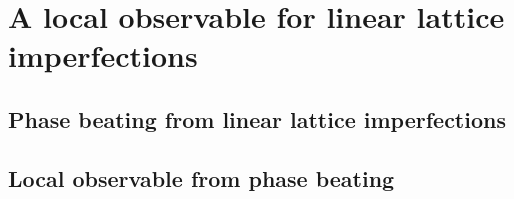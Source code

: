 \chapter{A local observable for linear lattice imperfections}
\label{ch_localobs}

\section{Phase beating from linear lattice imperfections}

\section{Local observable from phase beating}


